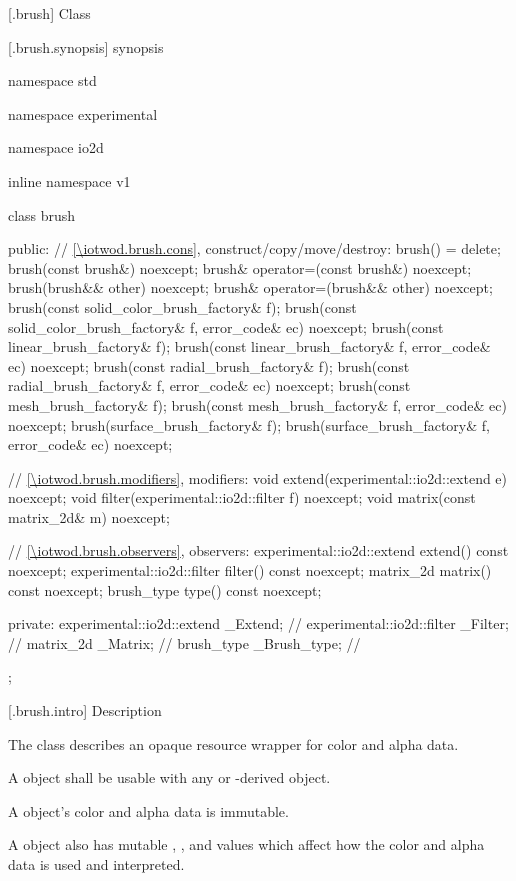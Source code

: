  [\iotwod.brush] {Class }

 [\iotwod.brush.synopsis] { synopsis}

\begin{codeblock}
namespace std { namespace experimental { namespace io2d { inline namespace v1 {
  class brush {
  public:
    // \ref{\iotwod.brush.cons}, construct/copy/move/destroy:
    brush() = delete;
    brush(const brush&) noexcept;
    brush& operator=(const brush&) noexcept;
    brush(brush&& other) noexcept;
    brush& operator=(brush&& other) noexcept;
    brush(const solid_color_brush_factory& f);
    brush(const solid_color_brush_factory& f, error_code& ec) noexcept;
    brush(const linear_brush_factory& f);
    brush(const linear_brush_factory& f, error_code& ec) noexcept;
    brush(const radial_brush_factory& f);
    brush(const radial_brush_factory& f, error_code& ec) noexcept;
    brush(const mesh_brush_factory& f);
    brush(const mesh_brush_factory& f, error_code& ec) noexcept;
    brush(surface_brush_factory& f);
    brush(surface_brush_factory& f, error_code& ec) noexcept;

    // \ref{\iotwod.brush.modifiers}, modifiers:
    void extend(experimental::io2d::extend e) noexcept;
    void filter(experimental::io2d::filter f) noexcept;
    void matrix(const matrix_2d& m) noexcept;

    // \ref{\iotwod.brush.observers}, observers:
    experimental::io2d::extend extend() const noexcept;
    experimental::io2d::filter filter() const noexcept;
    matrix_2d matrix() const noexcept;
    brush_type type() const noexcept;

  private:
    experimental::io2d::extend _Extend; // \expos
    experimental::io2d::filter _Filter; // \expos
    matrix_2d _Matrix;                         // \expos
    brush_type _Brush_type;                    // \expos
  };
} } } }
\end{codeblock}

 [\iotwod.brush.intro] { Description}

\pnum
{}
The class  describes an opaque resource wrapper for color and alpha data.

\pnum
A  object shall be usable with any  or -derived object.

\pnum
A  object's color and alpha data is immutable.

\pnum
A  object also has mutable , , and  values which affect how the color and alpha data is used and interpreted.

